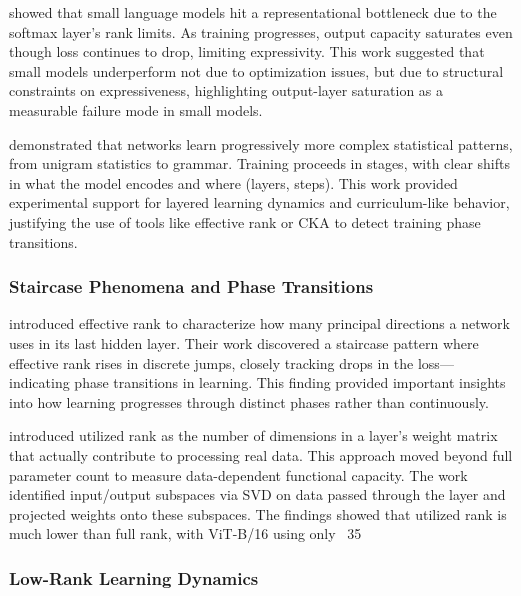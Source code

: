 \citet{godey2024small} showed that small language models hit a representational bottleneck due to the softmax layer's rank limits. As training progresses, output capacity saturates even though loss continues to drop, limiting expressivity. This work suggested that small models underperform not due to optimization issues, but due to structural constraints on expressiveness, highlighting output-layer saturation as a measurable failure mode in small models.

\citet{belrose2024neural} demonstrated that networks learn progressively more complex statistical patterns, from unigram statistics to grammar. Training proceeds in stages, with clear shifts in what the model encodes and where (layers, steps). This work provided experimental support for layered learning dynamics and curriculum-like behavior, justifying the use of tools like effective rank or CKA to detect training phase transitions.

\subsubsection{Staircase Phenomena and Phase Transitions}

\citet{yang2024rankstaircase} introduced effective rank to characterize how many principal directions a network uses in its last hidden layer. Their work discovered a staircase pattern where effective rank rises in discrete jumps, closely tracking drops in the loss—indicating phase transitions in learning. This finding provided important insights into how learning progresses through distinct phases rather than continuously.

\citet{garg2025utilizedrank} introduced utilized rank as the number of dimensions in a layer's weight matrix that actually contribute to processing real data. This approach moved beyond full parameter count to measure data-dependent functional capacity. The work identified input/output subspaces via SVD on data passed through the layer and projected weights onto these subspaces. The findings showed that utilized rank is much lower than full rank, with ViT-B/16 using only ~35%

\subsubsection{Low-Rank Learning Dynamics}

